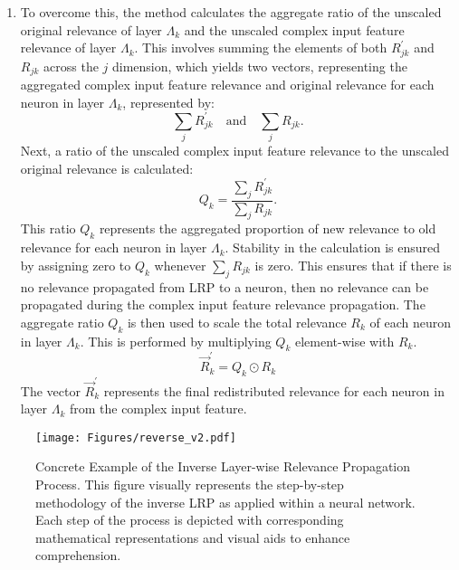 \begin{enumerate}
\item To overcome this, the method calculates the aggregate ratio of the unscaled original relevance of layer $\Lambda_k$ and the unscaled complex input feature relevance of layer $\Lambda_k$. This involves summing the elements of both \( R_{jk}^\prime \) and \( R_{jk} \) across the \( j \) dimension, which yields two vectors, representing the aggregated complex input feature relevance and original relevance for each neuron in layer \( \Lambda_k \), represented by:
\begin{equation*}
\sum_{j} R_{jk}^\prime \quad \text{and} \quad \sum_{j} R_{jk}.
\end{equation*}
Next, a ratio of the unscaled complex input feature relevance to the unscaled original relevance is calculated:
\begin{equation*}
  Q_{k} = \frac{\sum_{j} R_{jk}^\prime}{\sum_{j} R_{jk}}.
\end{equation*}
This ratio \( Q_{k} \) represents the aggregated proportion of new relevance to old relevance for each neuron in layer \( \Lambda_k \). Stability in the calculation is ensured by assigning zero to $Q_{k}$ whenever \( \sum_{j} R_{jk} \) is zero. This ensures that if there is no relevance propagated from LRP to a neuron, then no relevance can be propagated during the complex input feature relevance propagation. The aggregate ratio \( Q_{k} \) is then used to scale the total relevance \( R_k \) of each neuron in layer \( \Lambda_k \). This is performed by multiplying \( Q_{k} \) element-wise with \( R_k \).
\begin{equation*}
    \vec{R}_k^\prime = Q_{k} \odot R_{k}
\end{equation*}
The vector \( \vec{R}_k^\prime \) represents the final redistributed relevance for each neuron in layer \( \Lambda_k \) from the complex input feature.

\end{enumerate}

\begin{figure}[ht!]
\begin{center}
\texttt{[image: Figures/reverse\_v2.pdf]}
\end{center}
\caption{Concrete Example of the Inverse Layer-wise Relevance Propagation Process. This figure visually represents the step-by-step methodology of the inverse LRP as applied within a neural network. Each step of the process is depicted with corresponding mathematical representations and visual aids to enhance comprehension.}

\label{Fig:reverse_LRP_breakdown}
\end{figure} 

